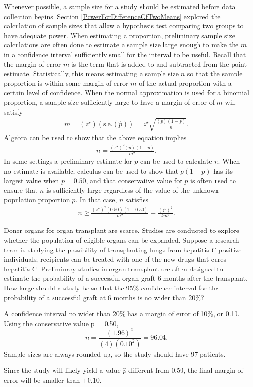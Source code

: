 Whenever possible, a sample size for a study should be estimated before data collection begins.  Section \ref{PowerForDifferenceOfTwoMeans} explored the calculation of sample sizes that allow a hypothesis test comparing two groups to have adequate power.  When estimating a proportion, preliminary sample size calculations are often done to estimate a sample size large enough to make the  $m$ in a confidence interval sufficiently small for the interval to be useful. Recall that the margin of error $m$ is the term that is added to and subtracted from the point estimate.  Statistically, this means estimating a sample size $n$ so that the sample proportion is within some margin of error $m$ of the actual proportion with a certain level of confidence. When the normal approximation is used for a binomial proportion, a sample size sufficiently large to have a margin of error of $m$ will satisfy 
\begin{align*}
 m = (z^{\star})(\text{s.e.}(\hat{p})) = z^{\star} \sqrt{\frac{(p)(1 - p)}{n}}. 
\end{align*}
Algebra can be used to show that the above equation implies
\begin{align*}
n = \frac{(z^{\star})^2(p)(1 - p)}{m^2}.
\end{align*}
In some settings a preliminary estimate for $p$ can be used to calculate $n$.  When no estimate is available, calculus can be used to show that $p(1 - p)$ has its largest value when $p = 0.50$, and that conservative value for $p$ is often used to ensure that $n$ is sufficiently large regardless of the value of the unknown population proportion $p$.  In  that case, $n$ satisfies
\begin{align*}
  n \geq \frac{(z^{\star})^2(0.50)(1-0.50)}{m^2} = \frac{(z^{\star})^2}{4m^2}.
\end{align*}

\textD{\newpage}

\begin{examplewrap}
\begin{nexample}{Donor organs for organ transplant are scarce. Studies are conducted to explore whether the population of eligible organs can be expanded. Suppose a research team is studying the possibility of transplanting lungs from hepatitis C positive individuals; recipients can be treated with one of the new drugs that cures hepatitis C. Preliminary studies in organ transplant are often designed to estimate the probability of a successful organ graft 6 months after the transplant.  How large should a study be so that the 95\% confidence interval for the probability of a successful graft at 6 months is no wider than 20\%?}

A confidence interval no wider than 20\% has a margin of error of 10\%, or 0.10.  Using the conservative value p = 0.50,
\[n = \frac{(1.96)^2}{(4)(0.10^2)} =  96.04.\]
Sample sizes are always rounded up, so the study should have 97 patients.  

Since the study will likely yield a value $\hat{p}$ different from 0.50, the final margin of error will be smaller than $\pm 0.10$.
\end{nexample}
\end{examplewrap}

